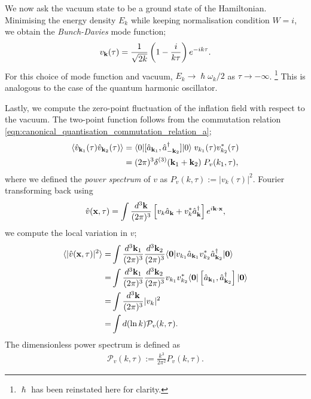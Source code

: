 We now ask the vacuum state to be a ground state of the Hamiltonian. Minimising the energy density $E_k$ while keeping normalisation condition $W=i$, we obtain the \textit{Bunch-Davies} mode function;
\begin{align}
	v_\mathbf{k}(\tau) = \frac{1}{\sqrt{2k}} \left( 1 - \frac{i}{k\tau} \right) e^{-ik\tau}. \label{eqn:bunch_davies_mode_function}
\end{align}
For this choice of mode function and vacuum, $E_k \rightarrow \hslash\omega_k/2$ as $\tau \rightarrow -\infty$. \footnote{$\hslash$ has been reinstated here for clarity.} This is analogous to the case of the quantum harmonic oscillator.

Lastly, we compute the zero-point fluctuation of the inflation field with respect to the vacuum. The two-point function follows from the commutation relation \eqref{eqn:canonical_quantisation_commutation_relation_a};
\begin{align}
	\langle \hat{v}_{\mathbf{k}_1} (\tau) \hat{v}_{\mathbf{k}_2} (\tau) \rangle &= \langle 0| [\hat{a}_{\mathbf{k}_1}, \hat{a}^\dagger_{-\mathbf{k}_2}] |0 \rangle \; v_{k_1}(\tau) v^*_{k_2}(\tau) \\
	&= (2\pi)^3 \delta^{(3)} (\mathbf{k}_1 + \mathbf{k}_2 ) \; P_{v}(k_1,\tau),   \label{eqn:single_field_inflation_power_spectrum}
\end{align}
where we defined the \textit{power spectrum} of $v$ as $P_v(k,\tau) := |v_k(\tau)|^2$. Fourier transforming back using
\begin{align}
	\hat{v}(\mathbf{x}, \tau) = \int \frac{d^3\mathbf{k}}{(2\pi)^3} \left[ v_k \hat{a}_\mathbf{k} + v^*_k \hat{a}^\dagger_\mathbf{k} \right] e^{i\mathbf{k} \cdot \mathbf{x}},
\end{align}
we compute the local variation in $v$;
\begin{align}
	\langle | \hat{v}(\mathbf{x}, \tau) |^2 \rangle =& \int \frac{d^3\mathbf{k}_1}{(2\pi)^3} \frac{d^3\mathbf{k}_2}{(2\pi)^3} \langle \mathbf{0} | v_{k_1} \hat{a}_{\mathbf{k}_1} v^*_{k_2} \hat{a}^\dagger_{\mathbf{k}_2} | \mathbf{0} \rangle 	\\
	=& \int \frac{d^3\mathbf{k}_1}{(2\pi)^3} \frac{d^3\mathbf{k}_2}{(2\pi)^3} v_{k_1} v^*_{k_2} \langle \mathbf{0} | \left[ \hat{a}_{\mathbf{k}_1}, \hat{a}^\dagger_{\mathbf{k}_2} \right] | \mathbf{0} \rangle	 \\
	=& \int \frac{d^3\mathbf{k}}{(2\pi)^3} |v_k|^2	\\
	=& \int d(\ln k) \mathcal{P}_v (k,\tau).
\end{align}
The dimensionless power spectrum is defined as
\begin{align}
	\mathcal{P}_v (k,\tau) := \frac{k^3}{2\pi^2} P_v(k,\tau).
\end{align}
